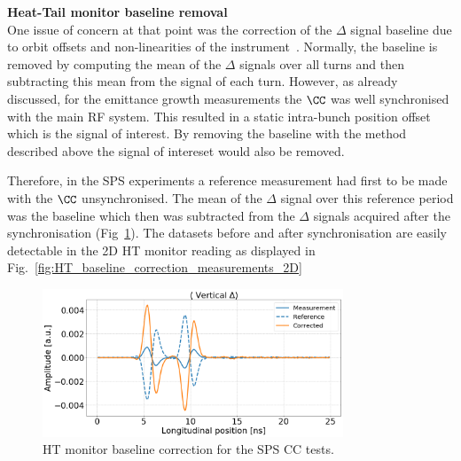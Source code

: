 \normalsize{\textbf{Heat-Tail monitor baseline removal}}\\
One issue of concern at that point was the correction of the $\Delta$ signal  baseline due to orbit offsets and non-linearities of the instrument~\cite{Levens:2313358}.  %
Normally, the baseline is removed by computing the mean of the $\Delta$ signals over all turns and then subtracting this mean from the signal of each turn. However, as already discussed, for the emittance growth measurements the $\CC$ was well synchronised with the main RF system. This resulted in a static intra-bunch position offset which is the signal of interest. By removing the baseline with the method described above the signal of intereset would also be removed.


Therefore, in the SPS experiments a reference measurement had first to be made with the $\CC$ unsynchronised. The mean of the $\Delta$ signal over this reference period was the baseline which then was subtracted from the $\Delta$ signals acquired after the synchronisation (Fig~\ref{fig:HT_baseline_correction}). The datasets before and after synchronisation are easily detectable in the 2D HT monitor reading as displayed in Fig.~\ref{fig:HT_baseline_correction_measurements_2D}

\begin{figure}[!h]
   \centering         
   \includegraphics[width=0.8\textwidth]{images/Ch4/HT_measures_vs_reference_vs_corrected__20180530_114730_baseline_correction.png}
       \caption{HT monitor baseline correction for the SPS CC tests.}
       \label{fig:HT_baseline_correction}
\end{figure}

